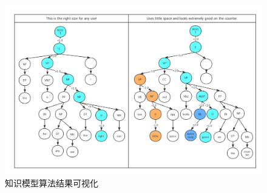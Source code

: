 \begin{figure}
\begin{center}
\includegraphics[width=\textwidth]{graphic/plainmodel3.png}
\caption{知识模型算法结果可视化 \label{fig:plainf3}}
\end{center}
\end{figure}
